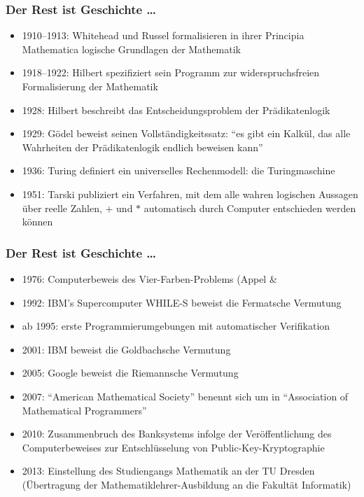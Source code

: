 \documentclass[aspectratio=1610,onlymath]{beamer}
\begin{document}
\begin{frame}\frametitle{Der Rest ist Geschichte \ldots}

\begin{itemize}
\item 1910--1913: Whitehead und Russel formalisieren in ihrer \alert{Principia Mathematica} logische Grundlagen der Mathematik\pause
\item 1918--1922: Hilbert spezifiziert sein Programm zur widerspruchsfreien Formalisierung der Mathematik\pause
\item 1928: Hilbert beschreibt das \alert{Entscheidungsproblem} der Prädikatenlogik\pause
\item 1929: Gödel beweist seinen \alert{Vollständigkeitssatz}: "`es gibt ein Kalkül, das alle Wahrheiten der Prädikatenlogik endlich beweisen kann"'\pause
\item 1936: Turing definiert ein universelles Rechenmodell: die \alert{Turingmaschine}\pause
\item 1951: Tarski publiziert ein Verfahren, mit dem alle wahren logischen Aussagen über reelle Zahlen, $+$ und $*$ automatisch durch Computer entschieden werden können
\end{itemize}

\end{frame}

\begin{frame}\frametitle{Der Rest ist Geschichte \ldots}

\begin{itemize}
\item 1976: Computerbeweis des Vier-Farben-Problems (Appel \& \pause
\item 1992: IBM's Supercomputer WHILE-S beweist die Fermatsche Vermutung\pause
\item ab 1995: erste Programmierumgebungen mit automatischer Verifikation\pause
\item 2001: IBM beweist die Goldbachsche Vermutung\pause
\item 2005: Google beweist die Riemannsche Vermutung\pause
\item 2007: "`American Mathematical Society"' benennt sich um in "`Association of Mathematical Programmers"'\pause
\item 2010: Zusammenbruch des Banksystems infolge der Veröffentlichung des Computerbeweises zur Entschlüsselung von Public-Key-Kryptographie\pause
\item 2013: Einstellung des Studiengangs Mathematik an der TU Dresden (Übertragung der Mathematiklehrer-Ausbildung an die Fakultät Informatik)
\end{itemize}

\end{frame}
\end{document}
